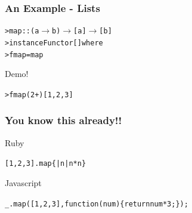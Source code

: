 \documentclass[12pt, xcolor=table]{beamer}
\begin{document}
\begin{frame}
    \frametitle{An Example - Lists}

    \begin{alltt}
        > map :: (a $\to$ b) $\to$ [a] $\to$ [b] \\
        > instance Functor [] where \\
        >   fmap = map
    \end{alltt}

    \begin{block}{Demo!}
        \begin{alltt}
            > fmap (2 +) [1,2,3]
        \end{alltt}
    \end{block}
\end{frame}

\begin{frame}
    \frametitle{You know this already!!}
    \begin{block}{Ruby}
        \begin{alltt}
            [1, 2, 3].map \{ |n| n * n \}
        \end{alltt}
    \end{block}
    \begin{block}{Javascript}
        \begin{alltt}
            \_.map([1, 2, 3], function(num)\{return num*3;\});
        \end{alltt}
    \end{block}
\end{frame}
\end{document}
